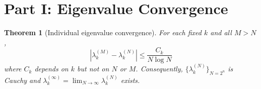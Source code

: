 \documentclass[11pt,a4paper]{article}
\newtheorem{theorem}{Theorem}[section]
\theoremstyle{definition}
\begin{document}
\section{Part I: Eigenvalue Convergence}
\label{sec:part1}

\begin{theorem}[Individual eigenvalue convergence]
For each fixed $k$ and all $M > N$,
\[
|\lambda_k^{(M)} - \lambda_k^{(N)}| \leq \frac{C_k}{N\log N}
\]
where $C_k$ depends on $k$ but not on $N$ or $M$. Consequently,
$\{\lambda_k^{(N)}\}_{N=2^n}$ is Cauchy and
$\lambda_k^{(\infty)} = \lim_{N\to\infty} \lambda_k^{(N)}$ exists.
\end{theorem}
\end{document}
